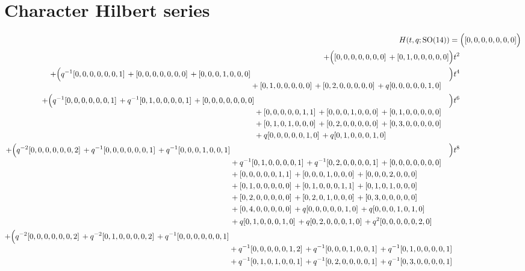 \documentclass[10pt]{article}
\begin{document}
\section{Character Hilbert series}
\[
\begin{aligned}
H(t,q;\mathrm{SO}(14)) ={}&
   \Bigl([0,0,0,0,0,0,0]\Bigr) \\
  + \Bigl([0,0,0,0,0,0,0]\,+[0,1,0,0,0,0,0]\Bigr)t^{2} \\
  + \Bigl(\begin{aligned}[t]q^{-1}[0,0,0,0,0,0,1]\,+[0,0,0,0,0,0,0]\,+[0,0,0,1,0,0,0] \\
  &{}+[0,1,0,0,0,0,0]\,+[0,2,0,0,0,0,0]\,+q[0,0,0,0,0,1,0]\end{aligned}\Bigr)t^{4} \\
  + \Bigl(\begin{aligned}[t]q^{-1}[0,0,0,0,0,0,1]\,+q^{-1}[0,1,0,0,0,0,1]\,+[0,0,0,0,0,0,0] \\
  &{}+[0,0,0,0,0,1,1]\,+[0,0,0,1,0,0,0]\,+[0,1,0,0,0,0,0] \\
  &{}+[0,1,0,1,0,0,0]\,+[0,2,0,0,0,0,0]\,+[0,3,0,0,0,0,0] \\
  &{}+q[0,0,0,0,0,1,0]\,+q[0,1,0,0,0,1,0]\end{aligned}\Bigr)t^{6} \\
  + \Bigl(\begin{aligned}[t]q^{-2}[0,0,0,0,0,0,2]\,+q^{-1}[0,0,0,0,0,0,1]\,+q^{-1}[0,0,0,1,0,0,1] \\
  &{}+q^{-1}[0,1,0,0,0,0,1]\,+q^{-1}[0,2,0,0,0,0,1]\,+[0,0,0,0,0,0,0] \\
  &{}+[0,0,0,0,0,1,1]\,+[0,0,0,1,0,0,0]\,+[0,0,0,2,0,0,0] \\
  &{}+[0,1,0,0,0,0,0]\,+[0,1,0,0,0,1,1]\,+[0,1,0,1,0,0,0] \\
  &{}+[0,2,0,0,0,0,0]\,+[0,2,0,1,0,0,0]\,+[0,3,0,0,0,0,0] \\
  &{}+[0,4,0,0,0,0,0]\,+q[0,0,0,0,0,1,0]\,+q[0,0,0,1,0,1,0] \\
  &{}+q[0,1,0,0,0,1,0]\,+q[0,2,0,0,0,1,0]\,+q^{2}[0,0,0,0,0,2,0]\end{aligned}\Bigr)t^{8} \\
  + \Bigl(\begin{aligned}[t]q^{-2}[0,0,0,0,0,0,2]\,+q^{-2}[0,1,0,0,0,0,2]\,+q^{-1}[0,0,0,0,0,0,1] \\
  &{}+q^{-1}[0,0,0,0,0,1,2]\,+q^{-1}[0,0,0,1,0,0,1]\,+q^{-1}[0,1,0,0,0,0,1] \\
  &{}+q^{-1}[0,1,0,1,0,0,1]\,+q^{-1}[0,2,0,0,0,0,1]\,+q^{-1}[0,3,0,0,0,0,1] \\

\end{aligned}
\end{aligned}\]
\end{document}
